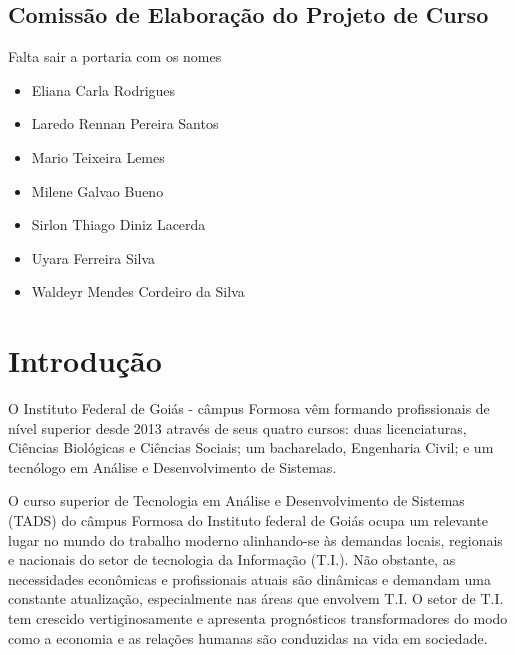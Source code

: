 \documentclass[
	10pt,				%
	openright,			%
	twoside,			%
	a4paper,			%
	english,			%
	french,				%
	brazil,				%
	sumario=tradicional
]{abntex2}
\newcommand{\vermelho}[1]{\begingroup\color{red}#1\endgroup}
\begin{document}
\section*{\textbf{Comissão de Elaboração do Projeto de Curso}}
\vermelho{Falta sair a portaria com os nomes}
\begin{itemize}[label=\bfseries]
	\item Eliana Carla Rodrigues
	\item Laredo Rennan Pereira Santos
	\item Mario Teixeira Lemes
	\item Milene Galvao Bueno
	\item Sirlon Thiago Diniz Lacerda
	\item Uyara Ferreira Silva
	\item Waldeyr Mendes Cordeiro da Silva
\end{itemize}

  
\chapter{Introdução}

O Instituto Federal de Goiás - câmpus Formosa vêm formando profissionais de nível superior desde 2013 através de seus quatro cursos: duas licenciaturas, Ciências Biológicas e Ciências Sociais; um bacharelado, Engenharia Civil; e um tecnólogo em Análise e Desenvolvimento de
Sistemas. 

O curso superior de Tecnologia em Análise e Desenvolvimento de Sistemas (TADS) do câmpus Formosa do Instituto federal de Goiás ocupa um relevante lugar no mundo do trabalho moderno alinhando-se às demandas locais, regionais e nacionais do setor de tecnologia da Informação (T.I.).
Não obstante, as necessidades econômicas e profissionais atuais são dinâmicas e demandam uma constante atualização, especialmente nas áreas que envolvem T.I. 
O setor de T.I. tem crescido vertiginosamente e apresenta prognósticos transformadores do modo como a economia e as relações humanas são conduzidas na vida em sociedade.
\end{document}
